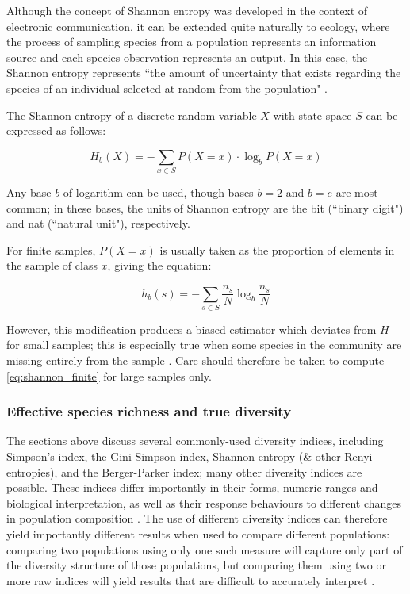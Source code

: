 Although the concept of Shannon entropy was developed in the context of electronic communication, it can be extended quite naturally to ecology, where the process of sampling species from a population represents an  information source and each species observation represents an output. In this case, the Shannon entropy represents  ``the amount of uncertainty that exists regarding the species of an individual selected at random from the population" \citep{peet1974diversity}.

The Shannon entropy of a discrete random variable $X$ with state space $S$ can be expressed as follows:

\begin{equation}
H_b(X) = -\sum_{x \in S} P(X=x) \cdot \log_b P(X=x)
\label{eq:shannon_infinite}
\end{equation}

Any base $b$ of logarithm can be used, though bases $b=2$ and $b=e$ are most common; in these bases, the units of Shannon entropy are the bit (``binary digit") and nat (``natural unit"), respectively. 

For finite samples, $P(X=x)$ is usually taken as the proportion of elements in the sample of class $x$, giving the equation:

\begin{equation}
h_b(s) = -\sum_{s \in S} \frac{n_s}{N} \log_b \frac{n_s}{N}
\label{eq:shannon_finite}
\end{equation}


However, this modification produces a biased estimator which deviates from $H$ for small samples; this is especially true when some species in the community are missing entirely from the sample \citep{peet1974diversity}. Care should therefore be taken to compute \autoref{eq:shannon_finite} for large samples only. %

\subsubsection{Effective species richness and true diversity} %
\label{sec:hill}

The sections above discuss several commonly-used diversity indices, including Simpson's index, the Gini-Simpson index, Shannon entropy (\& other Renyi entropies), and the Berger-Parker index; many other diversity indices are possible. These indices differ importantly in their forms, numeric ranges and biological interpretation, as well as their response behaviours to different changes in population composition \citep{peet1974diversity, jost2006entropy}. The use of different diversity indices can therefore yield importantly different results when used to compare different populations: comparing two populations using only one such measure will capture only part of the diversity structure of those populations, but comparing them using two or more raw indices will yield results that are difficult to accurately interpret \citep{peet1974diversity, jost2006entropy}.

